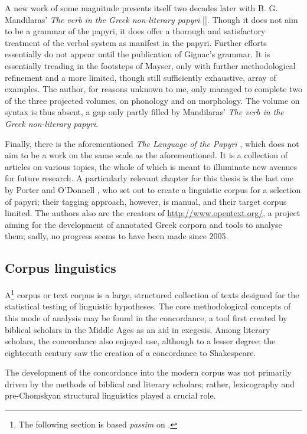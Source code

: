 A new work of some magnitude presents itself two decades later with B. G.
Mandilaras' \textit{The verb in the Greek non-literary papyri}
[\citeyear{mandilaras1973}]. Though it does not aim to be a grammar of the
papyri, it does offer a thorough and satisfactory treatment of the verbal
system as manifest in the papyri.  Further efforts essentially do not appear
until the publication of Gignac's grammar. It is essentially treading in the
footsteps of Mayser, only with further methodological refinement and a more
limited, though still sufficiently exhaustive, array of examples. The author,
for reasons unknown to me, only managed to complete two of the three projected
volumes, on phonology and on morphology. The volume on syntax is thus absent, a
gap only partly filled by Mandilaras' \textit{The verb in the Greek
non-literary papyri}.

Finally, there is the aforementioned \textit{The Language of the Papyri}
\citep{lpapyri}, which does not aim to be a work on the same scale as the
aforementioned. It is a collection of articles on various topics, the whole of
which is meant to illuminate new avenues for future research. A particularly
relevant chapter for this thesis is the last one by Porter and O'Donnell
\citep{porter2010}, who set out to create a linguistic corpus for a selection
of papyri; their tagging approach, however, is manual, and their target corpus
limited. The authors also are the creators of \url{http://www.opentext.org/}, a
project aiming for the development of annotated Greek corpora and tools to
analyse them; sadly, no progress seems to have been made since 2005.

\subsection{Corpus linguistics}
A\footnote{The following section is based \emph{passim} on
\citet{okeeffe2010}.} corpus or text corpus is a large, structured collection
of texts designed for the statistical testing of linguistic hypotheses. The
core methodological concepts of this mode of analysis may be found in the
concordance, a tool first created by biblical scholars in the Middle Ages as an
aid in exegesis. Among literary scholars, the concordance also enjoyed use,
although to a lesser degree; the eighteenth century saw the creation of a
concordance to Shakespeare.

 The development of the concordance into the modern corpus was not primarily
 driven by the methods of biblical and literary scholars; rather, lexicography
 and pre-Chomskyan structural linguistics played a crucial role.

